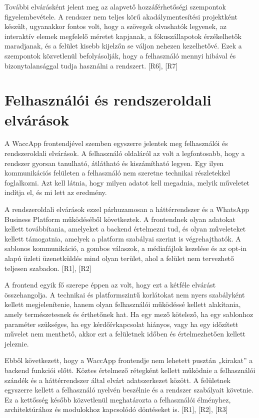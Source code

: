 További elvárásként jelent meg az alapvető hozzáférhetőségi szempontok figyelembevétele. A rendszer nem teljes körű akadálymentesítési projektként készült, ugyanakkor fontos volt, hogy a szövegek olvashatók legyenek, az interaktív elemek megfelelő méretet kapjanak, a fókuszállapotok érzékelhetők maradjanak, és a felület kisebb kijelzőn se váljon nehezen kezelhetővé. Ezek a szempontok közvetlenül befolyásolják, hogy a felhasználó mennyi hibával és bizonytalansággal tudja használni a rendszert. [R6], [R7]

\section{Felhasználói és rendszeroldali elvárások}

A WaccApp frontendjével szemben egyszerre jelentek meg felhasználói és rendszeroldali elvárások. A felhasználó oldaláról az volt a legfontosabb, hogy a rendszer gyorsan tanulható, átlátható és kiszámítható legyen. Egy ilyen kommunikációs felületen a felhasználó nem szeretne technikai részletekkel foglalkozni. Azt kell látnia, hogy milyen adatot kell megadnia, melyik műveletet indítja el, és mi lett az eredmény.

A rendszeroldali elvárások ezzel párhuzamosan a háttérrendszer és a WhatsApp Business Platform működéséből következtek. A frontendnek olyan adatokat kellett továbbítania, amelyeket a backend értelmezni tud, és olyan műveleteket kellett támogatnia, amelyek a platform szabályai szerint is végrehajthatók. A sablonos kommunikáció, a gombos válaszok, a médiafájlok kezelése és az opt-in alapú üzleti üzenetküldés mind olyan terület, ahol a felület nem tervezhető teljesen szabadon. [R1], [R2]

A frontend egyik fő szerepe éppen az volt, hogy ezt a kétféle elvárást összehangolja. A technikai és platformszintű korlátokat nem nyers szabályként kellett megjelenítenie, hanem olyan felhasználói működéssé kellett alakítania, amely természetesnek és érthetőnek hat. Ha egy mező kötelező, ha egy sablonhoz paraméter szükséges, ha egy kérdőívkapcsolat hiányos, vagy ha egy időzített művelet nem menthető, akkor ezt a felületnek időben és értelmezhetően kellett jeleznie.

Ebből következett, hogy a WaccApp frontendje nem lehetett pusztán „kirakat” a backend funkciói előtt. Köztes értelmező rétegként kellett működnie a felhasználói szándék és a háttérrendszer által elvárt adatszerkezet között. A felületnek egyszerre kellett a felhasználó nyelvén beszélnie és a rendszer szabályait követnie. Ez a kettősség később közvetlenül meghatározta a felhasználói élményhez, architektúrához és modulokhoz kapcsolódó döntéseket is. [R1], [R2], [R3]

